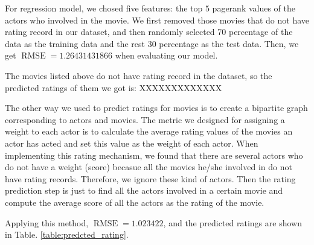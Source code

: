 \documentclass[11pt]{article}
\DeclareMathOperator{\RMSE}{RMSE}
\begin{document}
For regression model, we chosed five features: the top $5$ pagerank values of the actors who involved in the movie. We first removed those movies that do not have rating record in our dataset, and then randomly selected 70 percentage of the data as the training data and the rest 30 percentage as the test data. Then, we get $\RMSE = 1.26431431866$  when evaluating our model.

The movies listed above do not have rating record in the dataset, so the predicted ratings of them we got is: XXXXXXXXXXXXX

The other way we used to predict ratings for movies is to create a bipartite graph corresponding to actors and movies. The metric we designed for assigning a weight to each actor is to calculate the average rating values of the movies an actor has acted and set this value as the weight of each actor. When implementing this rating mechanism, we found that there are several actors who do not have a weight (score) becasue all the movies he/she involved in do not have rating records. Therefore, we ignore these kind of actors. Then the rating prediction step is just to find all the actors involved in a certain movie and compute the average score of all the actors as the rating of the movie.

Applying this method, $\RMSE=1.023422$, and the predicted ratings are shown in Table. \ref{table:predcted_rating}.

\begin{table}[H]
\center
\caption{Average rating vs. actual rating of the three movies, with community considered}
\label{table:predcted_rating}
\end{table}
\end{document}
